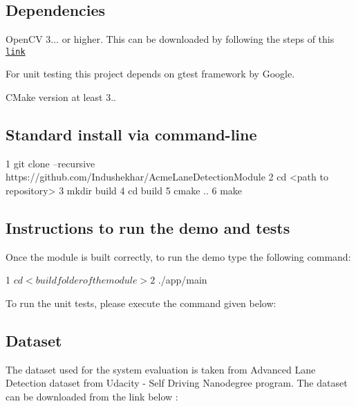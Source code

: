 \subsection*{Dependencies}


\begin{DoxyEnumerate}
\item Open\+CV 3... or higher. This can be downloaded by following the steps of this \href{https://www.learnopencv.com/install-opencv3-on-ubuntu/}{\tt link}
\item For unit testing this project depends on gtest framework by Google.
\item C\+Make version at least 3..
\end{DoxyEnumerate}

\subsection*{Standard install via command-\/line}


\begin{DoxyCode}
1 git clone --recursive https://github.com/Indushekhar/AcmeLaneDetectionModule
2 cd <path to repository>
3 mkdir build
4 cd build
5 cmake ..
6 make
\end{DoxyCode}
 \subsection*{Instructions to run the demo and tests}

Once the module is built correctly, to run the demo type the following command\+:


\begin{DoxyCode}
1 $ cd <build folder of the module>
2 $ ./app/main
\end{DoxyCode}


To run the unit tests, please execute the command given below\+:




\subsection*{Dataset}

The dataset used for the system evaluation is taken from Advanced Lane Detection dataset from Udacity -\/ Self Driving Nanodegree program. The dataset can be downloaded from the link below \+:

